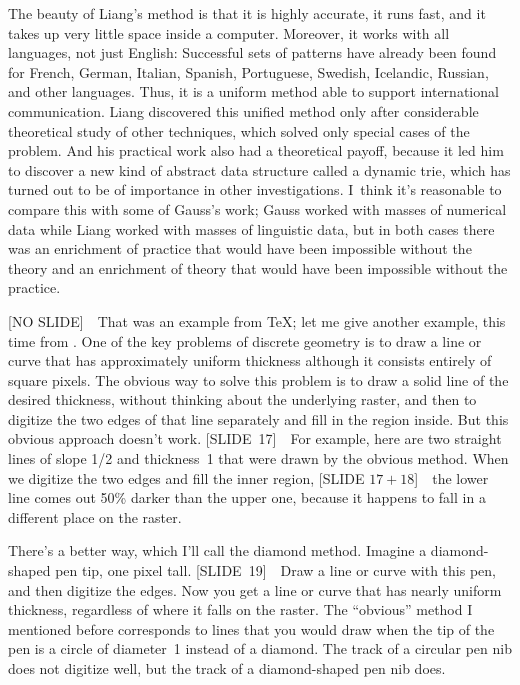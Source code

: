 The beauty of Liang's method is that it is highly accurate, it runs
fast, and it takes up very little space inside a computer. Moreover,
it works with all languages, not just English: Successful sets of
patterns have already been found for French, German, Italian, Spanish,
Portuguese, Swedish, Icelandic, Russian, and other languages. Thus, it
is a uniform method able to support international communication. Liang
discovered this unified method only after considerable theoretical
study of other techniques, which solved only special cases of the
problem. And his practical work also had a theoretical payoff, because
it led him to discover a new kind of abstract data structure called a
dynamic trie, which has turned out to be of importance in other
investigations. I~think it's reasonable to compare this with some of
Gauss's work; Gauss worked with masses of numerical data while Liang
worked with masses of linguistic data, but in both cases there was an
enrichment of practice that would have been impossible without the
theory and an enrichment of theory that would have been impossible
without the practice.

[NO SLIDE]\ \ That was an example from \TeX; let me give another
example, this time from \MF\kern-1pt. One of the key problems of
discrete geometry is to draw a line or curve that has approximately
uniform thickness although it consists entirely of square pixels. The
obvious way to solve this problem is to draw a solid line of the
desired thickness, without thinking about the underlying raster, and
then to digitize the two edges of that line separately and fill in the
region inside. But this obvious approach doesn't work. [SLIDE~17]\ \
For example, here are two straight lines of slope 1/2 and thickness~1
that were drawn by the obvious method. When we digitize the two edges
and fill the inner region, [SLIDE $17+18$]\ \  the lower line comes
out 50\% darker than the upper one, because it happens to fall in a
different place on the raster.

There's a better way, which I'll call the diamond method. Imagine a
diamond-shaped pen tip, one pixel tall. [SLIDE~19]\ \ Draw a line or
curve with this pen, and then digitize the edges. Now you get a line
or curve that has nearly uniform thickness, regardless of where it
falls on the raster. The ``obvious'' method I mentioned before
corresponds to lines that you would draw when the tip of the pen is a
circle of diameter~1 instead of a diamond. The track of a circular pen
nib does not digitize well, but the track of a diamond-shaped pen nib
does.

